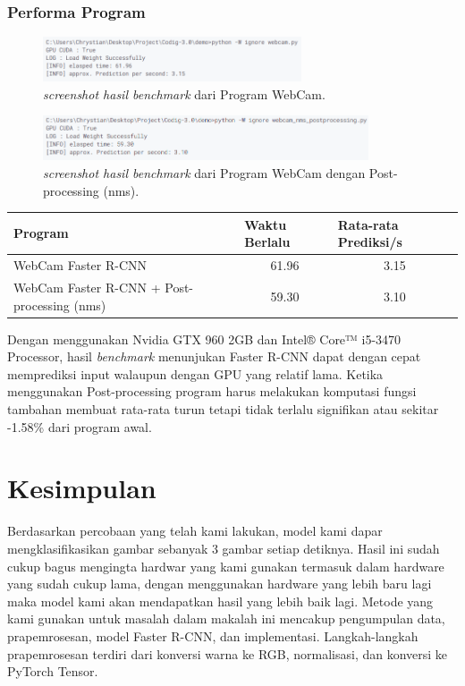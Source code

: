 \documentclass{article}
\begin{document}
  \subsubsection{Performa Program}

  
  
  \begin{figure}[H]
	\centering
	\includegraphics[height=50px]{benchmark/hasil1.png}
	\caption{\textit{screenshot hasil benchmark} dari Program WebCam.}
  \end{figure}

  \begin{figure}[H]
	\centering
	\includegraphics[height=50px]{benchmark/hasil2.png}
	\caption{\textit{screenshot hasil benchmark} dari Program WebCam dengan Post-processing (nms).}
  \end{figure}

  \begin{table}[H]
	\centering
	\begin{tabular}{lcc}
	\hline
	Program                                     & \multicolumn{1}{l}{Waktu Berlalu} & \multicolumn{1}{l}{Rata-rata Prediksi/s} \\ \hline
	WebCam Faster R-CNN                         & 61.96                             & 3.15                                     \\
	WebCam Faster R-CNN + Post-processing (nms) & 59.30                             & 3.10                                    
	\end{tabular}
	\end{table}

  Dengan menggunakan Nvidia GTX 960 2GB dan Intel® Core™ i5-3470 Processor, hasil \textit{benchmark} menunjukan Faster R-CNN dapat dengan cepat memprediksi input walaupun dengan GPU yang relatif lama. Ketika menggunakan Post-processing program harus melakukan komputasi fungsi tambahan membuat rata-rata turun tetapi tidak terlalu signifikan atau sekitar -1.58\% dari program awal. 

  \section{Kesimpulan}
  	\par Berdasarkan percobaan yang telah kami lakukan, model kami dapar mengklasifikasikan gambar sebanyak 3 gambar setiap detiknya. Hasil ini sudah cukup bagus mengingta hardwar yang kami gunakan termasuk dalam hardware yang sudah cukup lama, dengan menggunakan hardware yang lebih baru lagi maka model kami akan mendapatkan hasil yang lebih baik lagi. Metode yang kami gunakan untuk masalah dalam makalah ini mencakup pengumpulan data, prapemrosesan, model Faster R-CNN, dan implementasi. Langkah-langkah prapemrosesan terdiri dari konversi warna ke RGB, normalisasi, dan konversi ke PyTorch Tensor.
  	
\end{document}
